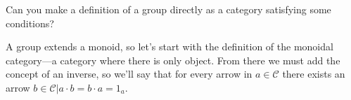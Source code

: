 \begin{ttta}
Can you make a definition of a group directly as a category satisfying some conditions?
\end{ttta}
A group extends a monoid, so let's start with the definition of the monoidal
category---a category where there is only object. From there we must add the
concept of an inverse, so we'll say that for every arrow in $a \in \mathcal{C}$
there exists an arrow $b\in\mathcal{C}| a\cdot b = b\cdot a = 1_a$.
